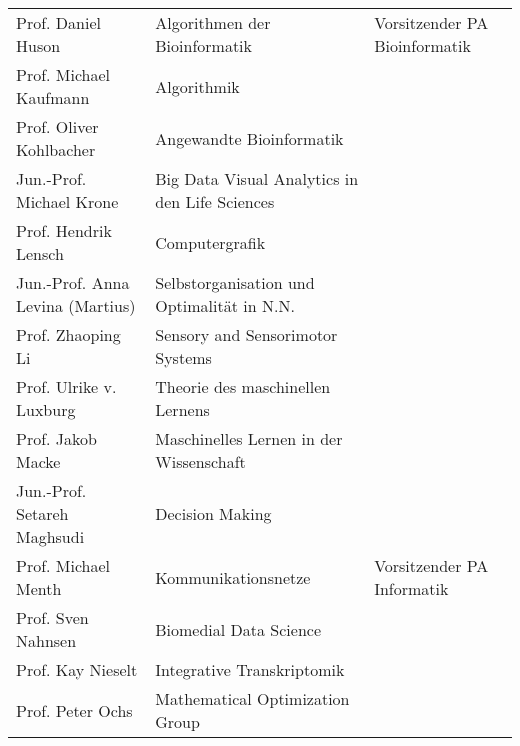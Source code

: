 \begin{tabular}{|lll|}
	Prof. Daniel Huson               & Algorithmen der Bioinformatik                         & Vorsitzender PA Bioinformatik            \\
	Prof. Michael Kaufmann           & Algorithmik                                           &                                          \\
	Prof. Oliver Kohlbacher          & Angewandte Bioinformatik                              &                                          \\
	Jun.-Prof. Michael Krone         & Big Data Visual Analytics in den Life Sciences        &                                          \\
	Prof. Hendrik Lensch             & Computergrafik                                        &                                          \\
	Jun.-Prof. Anna Levina (Martius) & Selbstorganisation und Optimalität in N.N.            &                                          \\
	Prof. Zhaoping Li                & Sensory and Sensorimotor Systems                      &                                          \\
	Prof. Ulrike v. Luxburg          & Theorie des maschinellen Lernens                      &                                          \\
	Prof. Jakob Macke                & Maschinelles Lernen in der Wissenschaft               &                                          \\
	Jun.-Prof. Setareh Maghsudi      & Decision Making                                       &                                          \\
	Prof. Michael Menth              & Kommunikationsnetze                                   & Vorsitzender PA Informatik               \\
	Prof. Sven Nahnsen               & Biomedial Data Science                                &                                          \\
	Prof. Kay Nieselt                & Integrative Transkriptomik                            &                                          \\
	Prof. Peter Ochs                 & Mathematical Optimization Group                       &                                          \\

\end{tabular}
